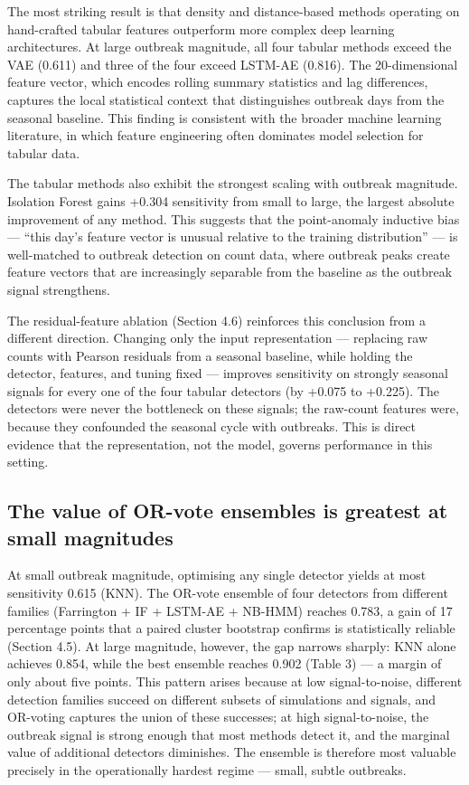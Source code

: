 \documentclass[11pt]{article}
\begin{document}
The most striking result is that density and distance-based methods operating on hand-crafted tabular features outperform more complex deep learning architectures. At large outbreak magnitude, all four tabular methods exceed the VAE (0.611) and three of the four exceed LSTM-AE (0.816). The 20-dimensional feature vector, which encodes rolling summary statistics and lag differences, captures the local statistical context that distinguishes outbreak days from the seasonal baseline. This finding is consistent with the broader machine learning literature, in which feature engineering often dominates model selection for tabular data.

The tabular methods also exhibit the strongest scaling with outbreak magnitude. Isolation Forest gains +0.304 sensitivity from small to large, the largest absolute improvement of any method. This suggests that the point-anomaly inductive bias --- ``this day's feature vector is unusual relative to the training distribution'' --- is well-matched to outbreak detection on count data, where outbreak peaks create feature vectors that are increasingly separable from the baseline as the outbreak signal strengthens.

The residual-feature ablation (Section 4.6) reinforces this conclusion from a different direction. Changing only the input representation --- replacing raw counts with Pearson residuals from a seasonal baseline, while holding the detector, features, and tuning fixed --- improves sensitivity on strongly seasonal signals for every one of the four tabular detectors (by +0.075 to +0.225). The detectors were never the bottleneck on these signals; the raw-count features were, because they confounded the seasonal cycle with outbreaks. This is direct evidence that the representation, not the model, governs performance in this setting.

\subsection{The value of OR-vote ensembles is greatest at small magnitudes}

At small outbreak magnitude, optimising any single detector yields at most sensitivity 0.615 (KNN). The OR-vote ensemble of four detectors from different families (Farrington + IF + LSTM-AE + NB-HMM) reaches 0.783, a gain of 17 percentage points that a paired cluster bootstrap confirms is statistically reliable (Section 4.5). At large magnitude, however, the gap narrows sharply: KNN alone achieves 0.854, while the best ensemble reaches 0.902 (Table 3) --- a margin of only about five points. This pattern arises because at low signal-to-noise, different detection families succeed on different subsets of simulations and signals, and OR-voting captures the union of these successes; at high signal-to-noise, the outbreak signal is strong enough that most methods detect it, and the marginal value of additional detectors diminishes. The ensemble is therefore most valuable precisely in the operationally hardest regime --- small, subtle outbreaks.
\end{document}

